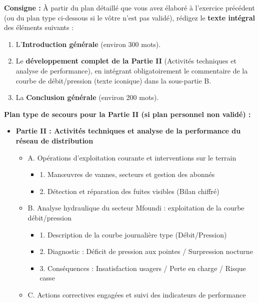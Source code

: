 \documentclass[11pt]{article}
\begin{document}
\begin{exercice}
\textbf{Consigne :} À partir du plan détaillé que vous avez élaboré à l'exercice précédent (ou du plan type ci-dessous si le vôtre n'est pas validé), rédigez le \textbf{texte intégral} des éléments suivants :
\begin{enumerate}
    \item L'\textbf{Introduction générale} (environ 300 mots).
    \item Le \textbf{développement complet de la Partie II} (Activités techniques et analyse de performance), en intégrant obligatoirement le commentaire de la courbe de débit/pression (texte iconique) dans la sous-partie B.
    \item La \textbf{Conclusion générale} (environ 200 mots).
\end{enumerate}

\textbf{Plan type de secours pour la Partie II (si plan personnel non validé) :}
\begin{itemize}
    \item \textbf{Partie II : Activités techniques et analyse de la performance du réseau de distribution}
        \begin{itemize}
            \item A. Opérations d'exploitation courante et interventions sur le terrain
                \begin{itemize}
                    \item 1. Manœuvres de vannes, secteurs et gestion des abonnés
                    \item 2. Détection et réparation des fuites visibles (Bilan chiffré)
                \end{itemize}
            \item B. Analyse hydraulique du secteur Mfoundi : exploitation de la courbe débit/pression
                \begin{itemize}
                    \item 1. Description de la courbe journalière type (Débit/Pression)
                    \item 2. Diagnostic : Déficit de pression aux pointes / Surpression nocturne
                    \item 3. Conséquences : Insatisfaction usagers / Perte en charge / Risque casse
                \end{itemize}
            \item C. Actions correctives engagées et suivi des indicateurs de performance
        \end{itemize}
\end{itemize}


\end{exercice}
\end{document}
